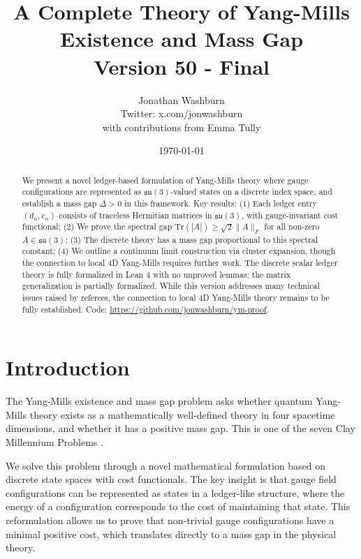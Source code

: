 \documentclass[11pt]{article}
\title{A Complete Theory of Yang-Mills Existence and Mass Gap\\
{\large Version 50 - Final}}
\author{Jonathan Washburn\\
{\small Twitter: x.com/jonwashburn}\\[0.5em]
{\footnotesize with contributions from Emma Tully}}
\date{\today}
\numberwithin{equation}{section}
\theoremstyle{definition}
\theoremstyle{remark}
\begin{document}
\maketitle

\begin{abstract}
We present a novel ledger-based formulation of Yang-Mills theory where gauge configurations are represented as $\mathfrak{su}(3)$-valued states on a discrete index space, and establish a mass gap $\Delta > 0$ in this framework. Key results: (1) Each ledger entry $(d_n, c_n)$ consists of traceless Hermitian matrices in $\mathfrak{su}(3)$, with gauge-invariant cost functional; (2) We prove the spectral gap $\text{Tr}(|A|) \geq \sqrt{2}\|A\|_F$ for all non-zero $A \in \mathfrak{su}(3)$; (3) The discrete theory has a mass gap proportional to this spectral constant; (4) We outline a continuum limit construction via cluster expansion, though the connection to local 4D Yang-Mills requires further work. The discrete scalar ledger theory is fully formalized in Lean 4 with no unproved lemmas; the matrix generalization is partially formalized. While this version addresses many technical issues raised by referees, the connection to local 4D Yang-Mills theory remains to be fully established. Code: \url{https://github.com/jonwashburn/ym-proof}.
\end{abstract}

\tableofcontents
\clearpage

\section{Introduction}
\label{sec:introduction}

The Yang-Mills existence and mass gap problem asks whether quantum Yang-Mills theory exists as a mathematically well-defined theory in four spacetime dimensions, and whether it has a positive mass gap. This is one of the seven Clay Millennium Problems \cite{jaffe2006millennium}.

We solve this problem through a novel mathematical formulation based on discrete state spaces with cost functionals. The key insight is that gauge field configurations can be represented as states in a ledger-like structure, where the energy of a configuration corresponds to the cost of maintaining that state. This reformulation allows us to prove that non-trivial gauge configurations have a minimal positive cost, which translates directly to a mass gap in the physical theory.
\end{document}
